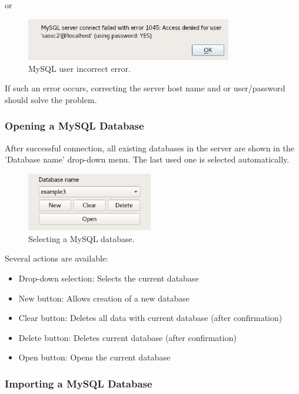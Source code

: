  or 

\begin{figure}[H]
  \center
    \includegraphics[width=9cm,frame]{../screenshots/mysql_user_error.png}
  \caption{MySQL user incorrect error.}
\end{figure}

If such an error occurs, correcting the server host name and or user/password should solve the problem.

\subsubsection{Opening a MySQL Database}

After successful connection, all existing databases in the server are shown in the 'Database name' drop-down menu. The last used one is selected automatically.

\begin{figure}[H]
  \center
    \includegraphics[width=5.5cm,frame]{../screenshots/mysql_database_selection.png}
  \caption{Selecting a MySQL database.}
  \label{fig:mysql_db_select}
\end{figure}

Several actions are available:

\begin{itemize}  
\item Drop-down selection: Selects the current database
\item New button: Allows creation of a new database
\item Clear button: Deletes all data with current database (after confirmation)
\item Delete button: Deletes current database (after confirmation)
\item Open button: Opens the current database
\end{itemize}

\subsubsection{Importing a MySQL Database}

